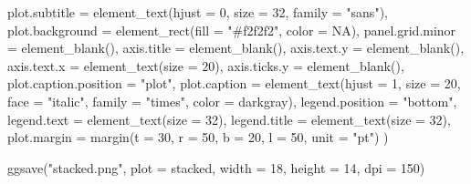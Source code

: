 \documentclass[
  letterpaper,
  DIV=11,
  numbers=noendperiod]{scrartcl}
\newenvironment{Shaded}{\begin{snugshade}}{\end{snugshade}}
\newcommand{\AttributeTok}[1]{\textcolor[rgb]{0.40,0.45,0.13}{#1}}
\newcommand{\ConstantTok}[1]{\textcolor[rgb]{0.56,0.35,0.01}{#1}}
\newcommand{\DecValTok}[1]{\textcolor[rgb]{0.68,0.00,0.00}{#1}}
\newcommand{\FunctionTok}[1]{\textcolor[rgb]{0.28,0.35,0.67}{#1}}
\newcommand{\NormalTok}[1]{\textcolor[rgb]{0.00,0.23,0.31}{#1}}
\newcommand{\StringTok}[1]{\textcolor[rgb]{0.13,0.47,0.30}{#1}}
\begin{document}
\begin{Shaded}
\begin{Highlighting}[]
    \AttributeTok{plot.subtitle =} \FunctionTok{element\_text}\NormalTok{(}\AttributeTok{hjust =} \DecValTok{0}\NormalTok{, }\AttributeTok{size =} \DecValTok{32}\NormalTok{, }\AttributeTok{family =} \StringTok{"sans"}\NormalTok{),}
    \AttributeTok{plot.background =} \FunctionTok{element\_rect}\NormalTok{(}\AttributeTok{fill =} \StringTok{"\#f2f2f2"}\NormalTok{, }\AttributeTok{color =} \ConstantTok{NA}\NormalTok{),}
    \AttributeTok{panel.grid.minor =} \FunctionTok{element\_blank}\NormalTok{(),}
    \AttributeTok{axis.title =} \FunctionTok{element\_blank}\NormalTok{(),}
    \AttributeTok{axis.text.y =} \FunctionTok{element\_blank}\NormalTok{(),}
    \AttributeTok{axis.text.x =} \FunctionTok{element\_text}\NormalTok{(}\AttributeTok{size =} \DecValTok{20}\NormalTok{),}
    \AttributeTok{axis.ticks.y =} \FunctionTok{element\_blank}\NormalTok{(),}
    \AttributeTok{plot.caption.position =} \StringTok{"plot"}\NormalTok{,}
    \AttributeTok{plot.caption =} \FunctionTok{element\_text}\NormalTok{(}\AttributeTok{hjust =} \DecValTok{1}\NormalTok{, }\AttributeTok{size =} \DecValTok{20}\NormalTok{, }\AttributeTok{face =} \StringTok{"italic"}\NormalTok{, }\AttributeTok{family =} \StringTok{"times"}\NormalTok{, }\AttributeTok{color =} \StringTok{\textquotesingle{}darkgray\textquotesingle{}}\NormalTok{),}
    \AttributeTok{legend.position =} \StringTok{"bottom"}\NormalTok{,}
    \AttributeTok{legend.text =} \FunctionTok{element\_text}\NormalTok{(}\AttributeTok{size =} \DecValTok{32}\NormalTok{),}
    \AttributeTok{legend.title =} \FunctionTok{element\_text}\NormalTok{(}\AttributeTok{size =} \DecValTok{32}\NormalTok{),}
    \AttributeTok{plot.margin =} \FunctionTok{margin}\NormalTok{(}\AttributeTok{t =} \DecValTok{30}\NormalTok{, }\AttributeTok{r =} \DecValTok{50}\NormalTok{, }\AttributeTok{b =} \DecValTok{20}\NormalTok{, }\AttributeTok{l =} \DecValTok{50}\NormalTok{, }\AttributeTok{unit =} \StringTok{"pt"}\NormalTok{)}
\NormalTok{  )}

\FunctionTok{ggsave}\NormalTok{(}\StringTok{"stacked.png"}\NormalTok{, }\AttributeTok{plot =}\NormalTok{ stacked, }\AttributeTok{width =} \DecValTok{18}\NormalTok{, }\AttributeTok{height =} \DecValTok{14}\NormalTok{, }\AttributeTok{dpi =} \DecValTok{150}\NormalTok{)}
\end{Highlighting}
\end{Shaded}
\end{document}
